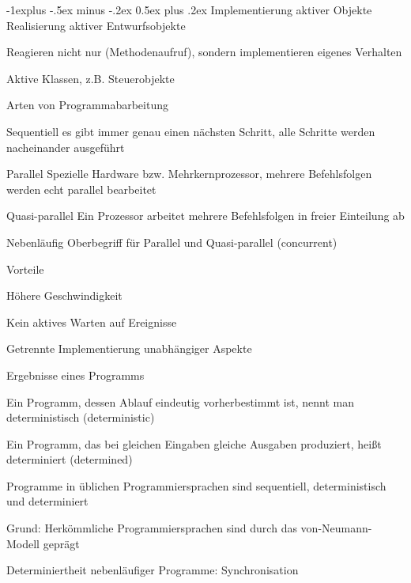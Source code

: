 \documentclass[a4paper]{article}
\makeatletter
\renewcommand{\subsection}{\@startsection{subsection}{2}{0mm}%
                                {-1explus -.5ex minus -.2ex}%
                                {0.5ex plus .2ex}%
                                {\normalfont\normalsize\bfseries}}
\makeatother
\begin{document}
\begin{multicols}{3}
  \subsection{Implementierung aktiver Objekte}
  Realisierung aktiver Entwurfsobjekte
  \begin{itemize*}
    \item Reagieren nicht nur (Methodenaufruf), sondern implementieren eigenes Verhalten
    \item Aktive Klassen, z.B. Steuerobjekte
  \end{itemize*}

  Arten von Programmabarbeitung
  \begin{description*}
    \item[Sequentiell] es gibt immer genau einen nächsten Schritt, alle Schritte werden nacheinander ausgeführt
    \item[Parallel] Spezielle Hardware bzw. Mehrkernprozessor, mehrere Befehlsfolgen werden echt parallel bearbeitet
    \item[Quasi-parallel] Ein Prozessor arbeitet mehrere Befehlsfolgen in freier Einteilung ab
    \item[Nebenläufig] Oberbegriff für Parallel und Quasi-parallel (concurrent)
  \end{description*}

  Vorteile
  \begin{itemize*}
    \item Höhere Geschwindigkeit
    \item Kein aktives Warten auf Ereignisse
    \item Getrennte Implementierung unabhängiger Aspekte
  \end{itemize*}

  Ergebnisse eines Programms
  \begin{itemize*}
    \item Ein Programm, dessen Ablauf eindeutig vorherbestimmt ist, nennt man deterministisch (deterministic)
    \item Ein Programm, das bei gleichen Eingaben gleiche Ausgaben produziert, heißt determiniert (determined)
    \item Programme in üblichen Programmiersprachen sind sequentiell, deterministisch und determiniert
    \item Grund: Herkömmliche Programmiersprachen sind durch das von-Neumann-Modell geprägt
    \item Determiniertheit nebenläufiger Programme: Synchronisation
  \end{itemize*}


\end{multicols}
\end{document}
